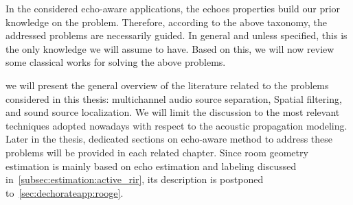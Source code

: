 \mynewline
In the considered echo-aware applications, the echoes properties build our prior knowledge on the problem.
Therefore, according to the above taxonomy, the addressed problems are necessarily guided.
In general and unless specified, this is the only knowledge we will assume to have.
Based on this, we will now review some classical works for solving the above problems.


 we will present the general overview of the literature related to the problems considered in this thesis: multichannel audio source separation, Spatial filtering, and sound source localization.
We will limit the discussion to the most relevant techniques adopted nowadays with respect to the acoustic propagation modeling.
Later in the thesis, dedicated sections on echo-aware method to address these problems will be provided in each related chapter.
Since room geometry estimation is mainly based on echo estimation and labeling discussed in~\cref{subsec:estimation:active_rir}, its description is postponed to~\cref{sec:dechorateapp:rooge}.


